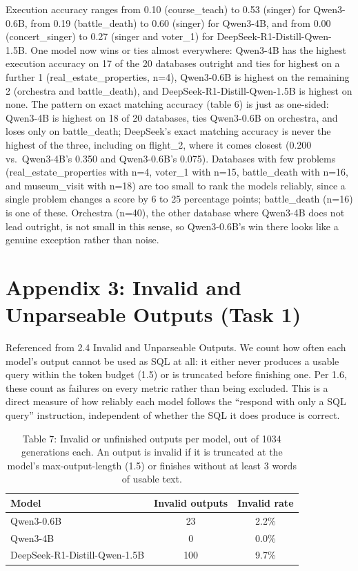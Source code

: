 \documentclass[11pt]{article}
\begin{document}
Execution accuracy ranges from 0.10 (course\_teach) to 0.53 (singer) for Qwen3-0.6B, from 0.19 (battle\_death) to 0.60 (singer) for Qwen3-4B, and from 0.00 (concert\_singer) to 0.27 (singer and voter\_1) for DeepSeek-R1-Distill-Qwen-1.5B. One model now wins or ties almost everywhere: Qwen3-4B has the highest execution accuracy on 17 of the 20 databases outright and ties for highest on a further 1 (real\_estate\_properties, n=4), Qwen3-0.6B is highest on the remaining 2 (orchestra and battle\_death), and DeepSeek-R1-Distill-Qwen-1.5B is highest on none. The pattern on exact matching accuracy (table 6) is just as one-sided: Qwen3-4B is highest on 18 of 20 databases, ties Qwen3-0.6B on orchestra, and loses only on battle\_death; DeepSeek's exact matching accuracy is never the highest of the three, including on flight\_2, where it comes closest (0.200 vs.\ Qwen3-4B's 0.350 and Qwen3-0.6B's 0.075). Databases with few problems (real\_estate\_properties with n=4, voter\_1 with n=15, battle\_death with n=16, and museum\_visit with n=18) are too small to rank the models reliably, since a single problem changes a score by 6 to 25 percentage points; battle\_death (n=16) is one of these. Orchestra (n=40), the other database where Qwen3-4B does not lead outright, is not small in this sense, so Qwen3-0.6B's win there looks like a genuine exception rather than noise.

\section*{Appendix 3: Invalid and Unparseable Outputs (Task 1)}

Referenced from 2.4 Invalid and Unparseable Outputs. We count how often each model's output cannot be used as SQL at all: it either never produces a usable query within the token budget (1.5) or is truncated before finishing one. Per 1.6, these count as failures on every metric rather than being excluded. This is a direct measure of how reliably each model follows the ``respond with only a SQL query'' instruction, independent of whether the SQL it does produce is correct.

\begin{table}[H]
\centering
\footnotesize
\caption{Table 7: Invalid or unfinished outputs per model, out of 1034 generations each. An output is invalid if it is truncated at the model's max-output-length (1.5) or finishes without at least 3 words of usable text.}
\begin{tabular}{lcc}
\toprule
Model & Invalid outputs & Invalid rate \\
\midrule
Qwen3-0.6B & 23 & 2.2\% \\
Qwen3-4B & 0 & 0.0\% \\
DeepSeek-R1-Distill-Qwen-1.5B & 100 & 9.7\% \\
\bottomrule
\end{tabular}
\end{table}
\end{document}

